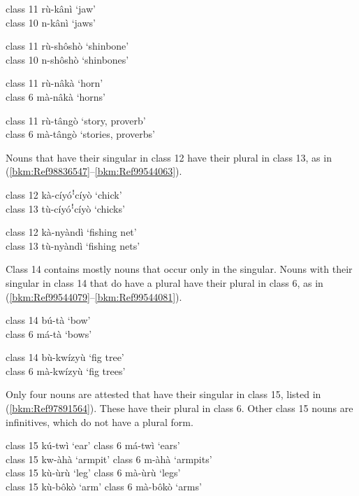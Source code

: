 \ea
\label{bkm:Ref491966094}
class 11  rù-kânì    ‘jaw’\\
class 10  n-kânì      ‘jaws’
\z

\ea
\label{bkm:Ref99544028}
class 11  rù-shôshò    ‘shinbone’\\
class 10  n-shôshò    ‘shinbones’
\z

\ea
\label{bkm:Ref491966095}
class 11  rù-nâkà    ‘horn’\\
class 6    mà-nâkà    ‘horns’
\z

\ea
\label{bkm:Ref99544029}
class 11  rù-tângò    ‘story, proverb’\\
class 6    mà-tângò    ‘stories, proverbs’
\z

Nouns that have their singular in class 12 have their plural in class 13, as in (\ref{bkm:Ref98836547}--\ref{bkm:Ref99544063}).

\ea
\label{bkm:Ref98836547}
class 12  kà-cíyóꜝcíyò    ‘chick’\\
class 13  tù-cíyóꜝcíyò    ‘chicks’
\z

\ea
\label{bkm:Ref99544063}
class 12  kà-nyàndì    ‘fishing net’\\
class 13  tù-nyàndì     ‘fishing nets’
\z

Class 14 contains mostly nouns that occur only in the singular. Nouns with their singular in class 14 that do have a plural have their plural in class 6, as in (\ref{bkm:Ref99544079}--\ref{bkm:Ref99544081}).

\ea
\label{bkm:Ref99544079}
class 14  bú-tà      ‘bow’\\
class 6    má-tà      ‘bows’
\z

\ea
\label{bkm:Ref99544081}
class 14  bù-kwízyù    ‘fig tree’\\
class 6    mà-kwízyù    ‘fig trees’
\z

Only four nouns are attested that have their singular in class 15, listed in (\ref{bkm:Ref97891564}). These have their plural in class 6. Other class 15 nouns are infinitives, which do not have a plural form.

\ea
\label{bkm:Ref444168488}
\label{bkm:Ref97891564}
class 15  kú-twì  ‘ear’    \tab class 6    má-twì  ‘ears’\label{bkm:Ref492314890}\\
class 15  kw-àhà  ‘armpit’ \tab class 6    m-àhà    ‘armpits’\\
class 15  kù-ùrù  ‘leg’ \tab   class 6    mà-ùrù  ‘legs’\\
class 15  kù-bôkò  ‘arm’ \tab   class 6    mà-bôkò  ‘arms’
\z

